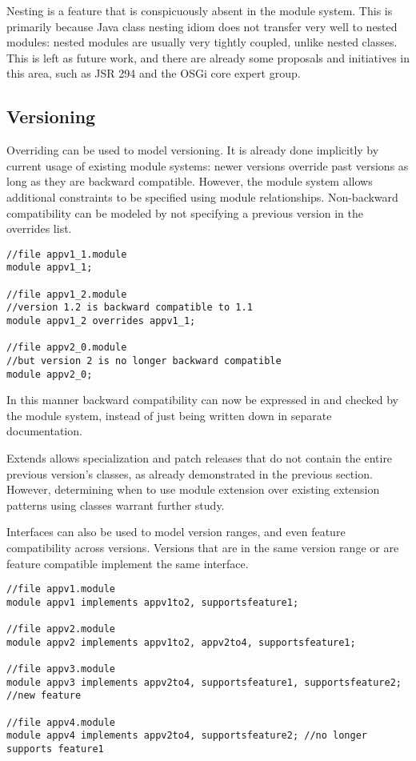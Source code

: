 Nesting is a feature that is conspicuously absent in the module system. This
is primarily because Java class nesting idiom does not transfer very well to
nested modules: nested modules are usually very tightly coupled, unlike nested
classes. This is left as future work, and there are already some proposals
and initiatives in this area, such as JSR 294 and the OSGi core expert group.

\subsection{Versioning}

Overriding can be used to model versioning. It is already done
implicitly by current usage of existing module systems: newer versions  
override past versions as long as they are backward compatible.
However, the module system allows additional constraints to be specified using
module relationships. Non-backward compatibility can be modeled by not specifying a
previous version in the overrides list.

\begin{lstlisting}[caption=Versioning Using Overrides]
//file appv1_1.module
module appv1_1;

//file appv1_2.module
//version 1.2 is backward compatible to 1.1
module appv1_2 overrides appv1_1;

//file appv2_0.module
//but version 2 is no longer backward compatible
module appv2_0; 
\end{lstlisting}

In this manner backward compatibility can now be expressed in 
and checked by the module system, instead of just being written
down in separate documentation.

Extends allows specialization and patch releases that do not contain 
the entire previous version's classes, as already demonstrated in
the previous section. However, determining when to use module
extension over existing extension patterns using classes warrant
further study.

Interfaces can also be used to model version ranges, and even feature
compatibility across versions. Versions that are in the same version 
range or are feature compatible implement the same interface.

\begin{lstlisting}[caption=Interfaces as Properties]
//file appv1.module
module appv1 implements appv1to2, supportsfeature1;

//file appv2.module
module appv2 implements appv1to2, appv2to4, supportsfeature1;

//file appv3.module
module appv3 implements appv2to4, supportsfeature1, supportsfeature2; //new feature

//file appv4.module
module appv4 implements appv2to4, supportsfeature2; //no longer supports feature1
\end{lstlisting}

